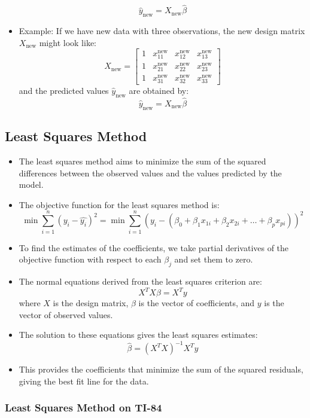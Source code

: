 \documentclass{article}
\begin{document}
\begin{itemize}
    \[
    \hat{y}_{\text{new}} = X_{\text{new}} \hat{\beta}
    \]
    \item Example: If we have new data with three observations, the new design matrix $X_{\text{new}}$ might look like:
    \[
    X_{\text{new}} = \begin{bmatrix}
    1 & x_{11}^{\text{new}} & x_{12}^{\text{new}} & x_{13}^{\text{new}} \\
    1 & x_{21}^{\text{new}} & x_{22}^{\text{new}} & x_{23}^{\text{new}} \\
    1 & x_{31}^{\text{new}} & x_{32}^{\text{new}} & x_{33}^{\text{new}}
    \end{bmatrix}
    \]
    and the predicted values $\hat{y}_{\text{new}}$ are obtained by:
    \[
    \hat{y}_{\text{new}} = X_{\text{new}} \hat{\beta}
    \]
\end{itemize}


\subsection{Least Squares Method}

\begin{itemize}
    \item The least squares method aims to minimize the sum of the squared differences between the observed values and the values predicted by the model.
    \item The objective function for the least squares method is: 
    \[
    \min \sum_{i=1}^{n}(y_i - \hat{y_i})^2 = \min \sum_{i=1}^{n}(y_i - (\beta_0 + \beta_1 x_{1i} + \beta_2 x_{2i} + \dots + \beta_p x_{pi}))^2
    \]
    \item To find the estimates of the coefficients, we take partial derivatives of the objective function with respect to each $\beta_j$ and set them to zero.
    \item The normal equations derived from the least squares criterion are:
    \[
    X^TX\beta = X^Ty
    \]
    where $X$ is the design matrix, $\beta$ is the vector of coefficients, and $y$ is the vector of observed values.
    \item The solution to these equations gives the least squares estimates:
    \[
    \hat{\beta} = (X^TX)^{-1}X^Ty
    \]
    \item This provides the coefficients that minimize the sum of the squared residuals, giving the best fit line for the data.
\end{itemize}

\subsubsection{Least Squares Method on TI-84}
\end{document}
